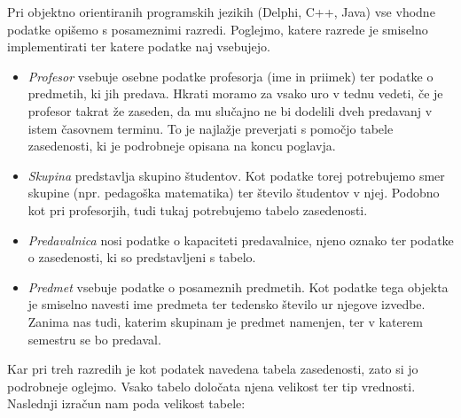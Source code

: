 \documentclass[10pt,a4paper]{article}
\begin{document}
Pri objektno orientiranih programskih jezikih (Delphi, C++, Java) vse vhodne podatke
opišemo s posameznimi razredi. Poglejmo, katere razrede je smiselno implementirati ter
katere podatke naj vsebujejo.


\begin{itemize}
\item   \emph{Profesor} vsebuje osebne podatke profesorja (ime in priimek) ter
   podatke o predmetih, ki jih predava. Hkrati moramo za vsako uro v tednu vedeti, če
   je profesor takrat že zaseden, da mu slučajno ne bi dodelili dveh predavanj v istem
   časovnem terminu. To je najlažje preverjati s pomočjo tabele zasedenosti, ki je
   podrobneje opisana na koncu poglavja.

\item   \emph{Skupina} predstavlja skupino študentov. Kot podatke torej potrebujemo
   smer skupine (npr. pedagoška matematika) ter število študentov v njej. Podobno kot pri
   profesorjih, tudi tukaj potrebujemo tabelo zasedenosti.

\item   \emph{Predavalnica} nosi podatke o kapaciteti predavalnice, njeno oznako
   ter podatke o zasedenosti, ki so predstavljeni s tabelo.

\item   \emph{Predmet} vsebuje podatke o posameznih predmetih. Kot podatke tega
   objekta je smiselno navesti ime predmeta ter tedensko število ur njegove izvedbe.
   Zanima nas tudi, katerim skupinam je predmet namenjen, ter v katerem semestru se bo
   predaval.

\end{itemize}
Kar pri treh razredih je kot podatek navedena tabela zasedenosti, zato si jo podrobneje
oglejmo. Vsako tabelo določata njena velikost ter tip vrednosti. Naslednji izračun nam
poda velikost tabele:
\end{document}
